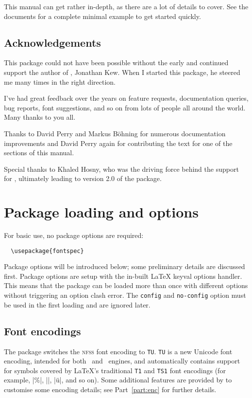 \documentclass[a4paper]{l3doc}
\begin{document}
This manual can get rather in-depth, as there are a lot of details
to cover. See the documents  for a complete minimal example
to get started quickly.


\subsection{Acknowledgements}

This package could not have been possible without the early and continued support
the author of \XeTeX, Jonathan Kew. When I started this package, he steered
me many times in the right direction.

I've had great
feedback over the years on feature requests, documentation queries, bug reports, font suggestions, and so on from lots of people all around the world.
Many thanks to you all.

Thanks to David Perry and Markus B\"ohning for numerous documentation
improvements and David Perry again for contributing the text for one of the
sections of this manual.

Special thanks to Khaled Hosny, who was the driving force behind the support for \LuaLaTeX, ultimately leading to version 2.0 of the package.



\section{Package loading and options}

For basic use, no package options are required:
\begin{Verbatim}
  \usepackage{fontspec}
\end{Verbatim}
Package options will be introduced below; some preliminary details are discussed first.
Package options are setup with the in-built \LaTeX{} keyval options handler. This means
that the package can be loaded more than once with different options without triggering
an option clash error. The \texttt{config} and \texttt{no-config} option must be used in
the first loading and are ignored later.

\subsection{Font encodings}

The package switches the \textsc{nfss} font encoding to \texttt{TU}.
\texttt{TU} is a new Unicode font encoding, intended for both \XeTeX\ and \LuaTeX\ engines, and automatically contains support for symbols covered by \LaTeX's traditional \texttt{T1} and \texttt{TS1} font encodings (for example, |\%|, |\textbullet|, |\"u|, and so on).
Some additional features are provided by  to customise some encoding details; see Part~\vref{part:enc} for further details.
\end{document}
